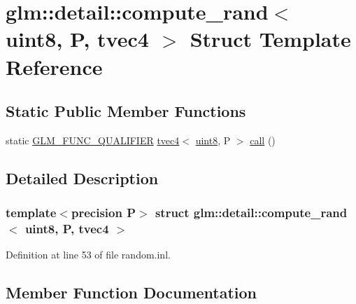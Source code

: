 \hypertarget{structglm_1_1detail_1_1compute__rand_3_01uint8_00_01_p_00_01tvec4_01_4}{}\section{glm\+::detail\+::compute\+\_\+rand$<$ uint8, P, tvec4 $>$ Struct Template Reference}
\label{structglm_1_1detail_1_1compute__rand_3_01uint8_00_01_p_00_01tvec4_01_4}
\subsection*{Static Public Member Functions}
\begin{DoxyCompactItemize}
\item 
static \mbox{\hyperlink{setup_8hpp_a33fdea6f91c5f834105f7415e2a64407}{G\+L\+M\+\_\+\+F\+U\+N\+C\+\_\+\+Q\+U\+A\+L\+I\+F\+I\+ER}} \mbox{\hyperlink{structglm_1_1tvec4}{tvec4}}$<$ \mbox{\hyperlink{namespaceglm_1_1detail_aef2588f97d090cc19fbbe0c74fe17c8f}{uint8}}, P $>$ \mbox{\hyperlink{structglm_1_1detail_1_1compute__rand_3_01uint8_00_01_p_00_01tvec4_01_4_ad9fa915c8140a6fa885534d8c60e35fd}{call}} ()
\end{DoxyCompactItemize}


\subsection{Detailed Description}
\subsubsection*{template$<$precision P$>$\newline
struct glm\+::detail\+::compute\+\_\+rand$<$ uint8, P, tvec4 $>$}



Definition at line 53 of file random.\+inl.



\subsection{Member Function Documentation}
\mbox{\label{structglm_1_1detail_1_1compute__rand_3_01uint8_00_01_p_00_01tvec4_01_4_ad9fa915c8140a6fa885534d8c60e35fd}} 
